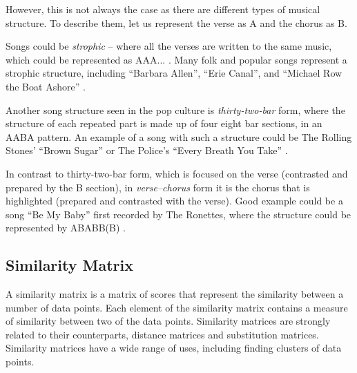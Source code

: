 However, this is not always the case as there are different types of musical structure. To describe them, let us represent the verse as A and the chorus as B. 

Songs could be \textit{strophic} -- where all the verses are written to the same music, which could be represented as AAA... . Many folk and popular songs represent a strophic structure, including ``Barbara Allen'', ``Erie Canal'', and ``Michael Row the Boat Ashore'' \cite{strophic}.

Another song structure seen in the pop culture is \textit{thirty-two-bar} form, where the structure of each repeated part is made up of four eight bar sections, in an AABA pattern. An example of a song with such a structure could be The Rolling Stones' ``Brown Sugar'' or The Police's ``Every Breath You Take'' \cite{32bar}. 

In contrast to thirty-two-bar form, which is focused on the verse (contrasted and prepared by the B section), in \textit{verse–chorus} form it is the chorus that is highlighted (prepared and contrasted with the verse). Good example could be a song ``Be My Baby'' first recorded by The Ronettes, where the structure could be represented by ABABB(B) \cite{32bar}.



\subsection{Similarity Matrix}

A similarity matrix is a matrix of scores that represent the similarity between a number of data points. Each element of the similarity matrix contains a measure of similarity between two of the data points. Similarity matrices are strongly related to their counterparts, distance matrices and substitution matrices.
Similarity matrices have a wide range of uses, including finding clusters of data points.

